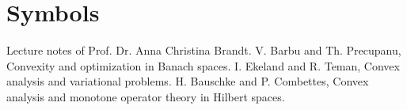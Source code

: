 \documentclass[CEJM,PDF]{cej} %
\begin{document}
\section*{Symbols}

\begin{thebibliography}{5}
 Lecture notes of Prof. Dr. Anna Christina Brandt.
 V. Barbu and Th. Precupanu, Convexity and optimization in Banach spaces.
 I. Ekeland and R. Teman, Convex analysis and variational problems.
 H. Bauschke and P. Combettes, Convex analysis and monotone operator theory in Hilbert spaces.
\end{thebibliography}
\end{document}

